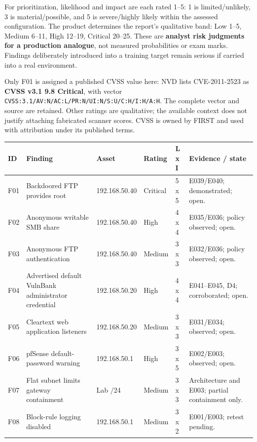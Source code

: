 \documentclass[11pt,a4paper]{article}
\begin{document}
For prioritization, likelihood and impact are each rated 1--5: 1 is limited/unlikely, 3 is material/possible, and 5 is severe/highly likely within the assessed configuration. The product determines the report's qualitative band: Low 1--5, Medium 6--11, High 12--19, Critical 20--25. These are \textbf{analyst risk judgments for a production analogue}, not measured probabilities or exam marks. Findings deliberately introduced into a training target remain serious if carried into a real environment.

Only F01 is assigned a published CVSS value here: NVD lists CVE-2011-2523 as \textbf{CVSS v3.1 9.8 Critical}, with vector \texttt{CVSS:3.1/AV:N/AC:L/PR:N/UI:N/S:U/C:H/I:H/A:H}. The complete vector and source are retained. Other ratings are qualitative; the available context does not justify attaching fabricated scanner scores. CVSS is owned by FIRST and used with attribution under its published terms.

\small
\begin{longtable}{@{}L{0.8cm}L{4.4cm}L{2.7cm}L{1.7cm}L{1.2cm}L{4.4cm}@{}}
\toprule
\textbf{ID} & \textbf{Finding} & \textbf{Asset} & \textbf{Rating} & \textbf{L x I} & \textbf{Evidence / state}\\
\midrule\endhead
F01 & Backdoored FTP provides root & 192.168.50.40 & Critical & 5 x 5 & E039/E040; demonstrated; open.\\
F02 & Anonymous writable SMB share & 192.168.50.40 & High & 4 x 4 & E035/E036; policy observed; open.\\
F03 & Anonymous FTP authentication & 192.168.50.40 & Medium & 3 x 3 & E032/E036; policy observed; open.\\
F04 & Advertised default VulnBank administrator credential & 192.168.50.20 & High & 4 x 4 & E041--E045, D4; corroborated; open.\\
F05 & Cleartext web application listeners & 192.168.50.20 & Medium & 3 x 3 & E031/E034; observed; open.\\
F06 & pfSense default-password warning & 192.168.50.1 & High & 3 x 5 & E002/E003; observed; open.\\
F07 & Flat subnet limits gateway containment & Lab /24 & Medium & 3 x 3 & Architecture and E003; partial containment only.\\
F08 & Block-rule logging disabled & 192.168.50.1 & Medium & 3 x 2 & E001/E003; retest pending.\\
\bottomrule
\end{longtable}
\normalsize
\end{document}
